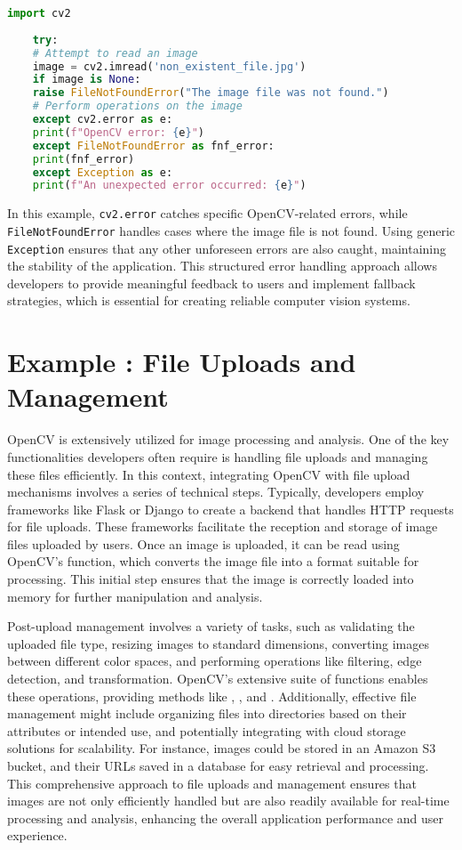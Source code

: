 \begin{lstlisting}[language=Python, caption=Example of error handling in OpenCV]
	import cv2
	
	try:
	# Attempt to read an image
	image = cv2.imread('non_existent_file.jpg')
	if image is None:
	raise FileNotFoundError("The image file was not found.")
	# Perform operations on the image
	except cv2.error as e:
	print(f"OpenCV error: {e}")
	except FileNotFoundError as fnf_error:
	print(fnf_error)
	except Exception as e:
	print(f"An unexpected error occurred: {e}")
\end{lstlisting}

In this example, \texttt{cv2.error} catches specific OpenCV-related errors, while \texttt{FileNotFoundError} handles cases where the image file is not found. Using generic \texttt{Exception} ensures that any other unforeseen errors are also caught, maintaining the stability of the application. This structured error handling approach allows developers to provide meaningful feedback to users and implement fallback strategies, which is essential for creating reliable computer vision systems.\cite{OpenCVTeam:2024} 

\section{Example : File Uploads and Management}

OpenCV is extensively utilized for image processing and analysis. One of the key functionalities developers often require is handling file uploads and managing these files efficiently. In this context, integrating OpenCV with file upload mechanisms involves a series of technical steps. Typically, developers employ frameworks like Flask or Django to create a backend that handles HTTP requests for file uploads. These frameworks facilitate the reception and storage of image files uploaded by users. Once an image is uploaded, it can be read using OpenCV's  function, which converts the image file into a format suitable for processing. This initial step ensures that the image is correctly loaded into memory for further manipulation and analysis.

Post-upload management involves a variety of tasks, such as validating the uploaded file type, resizing images to standard dimensions, converting images between different color spaces, and performing operations like filtering, edge detection, and transformation. OpenCV's extensive suite of functions enables these operations, providing methods like , , and . Additionally, effective file management might include organizing files into directories based on their attributes or intended use, and potentially integrating with cloud storage solutions for scalability. For instance, images could be stored in an Amazon S3 bucket, and their URLs saved in a database for easy retrieval and processing. This comprehensive approach to file uploads and management ensures that images are not only efficiently handled but are also readily available for real-time processing and analysis, enhancing the overall application performance and user experience. \cite{OpenCVTeam:2024}



